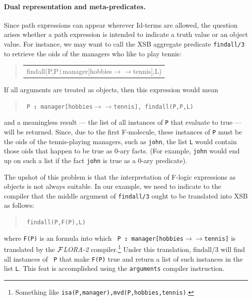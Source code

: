 \documentclass[11pt]{article}
\newenvironment{qrules}{\begin{quote}\tt\begin{tabular}[t]{l}}%
{\end{tabular}\end{quote}}
\newcommand{\isa}{\,{\bf{:}}\,}
\newcommand{\mvd}{\ensuremath{{\rightarrow\!\!\!\!\rightarrow}}}  %
\newcommand{\FLORA}{{\mbox{${\cal F}${\small\it LORA}\rm\emph{-2}}}\xspace}
\newcommand{\fl}{\mbox{F-logic}\xspace}
\begin{document}
\paragraph{Dual representation and meta-predicates.}
Since path expressions can appear wherever Id-terms are allowed, the
question arises whether a path expression is intended to indicate a truth
value or an object value. For instance, we may want to call the XSB
aggregate predicate {\tt findall/3} to retrieve the oids of the managers
who like to play tennis:
\begin{qrules}
findall(P,P{\isa}manager[hobbies{\mvd}tennis],L)
\end{qrules}
If all arguments are treated as objects, then this expression would mean
\begin{quote}
 \tt
 P{\isa}manager[hobbies{\mvd}tennis], findall(P,P,L)
\end{quote}
and a meaningless result --- the list of all instances of {\tt P} that
evaluate to true --- will be returned. Since, due to the first F-molecule,
these instances of {\tt P} must be the oids of the tennis-playing managers,
such as {\tt john}, the list {\tt L} would contain those oids that happen
to be true as 0-ary facts. (For example, {\tt john} would end up on such a
list if the fact {\tt john} is true as a 0-ary predicate).

The upshot of this problem is that the interpretation of \fl expressions as
objects is not always suitable. In our example, we need to indicate to the
compiler that the middle argument of {\tt findall/3} ought to be translated
into XSB as follows:
\begin{quote}
 \tt
 findall(P,F(P),L)
\end{quote}
where {\tt F(P)} is an formula into which {\tt
  P{\isa}manager[hobbies{\mvd}tennis]} is translated by the \FLORA
compiler.\footnote{
  Something like {\tt isa(P,manager),mvd(P,hobbies,tennis)}.
  }
Under this translation, findall/3 will find all instances of {\tt
  P} that make {\tt F(P)} true and return a list of such instances in the
list {\tt L}. This feat is accomplished using the {\tt arguments} compiler
instruction.
\end{document}
